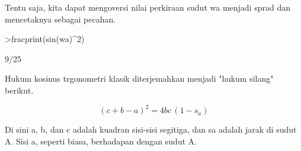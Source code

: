 \documentclass[12pt,arial,letterpaper]{book}
\begin{document}
\begin{eulercomment}
\begin{eulercomment}
\begin{eulercomment}
\begin{eulercomment}
\begin{eulercomment}
\begin{eulercomment}
\begin{eulercomment}
\begin{eulercomment}
\begin{eulercomment}
\begin{eulercomment}
\begin{eulercomment}
\begin{eulercomment}
\begin{eulercomment}
\begin{eulercomment}
\begin{eulercomment}
\begin{eulercomment}
\begin{eulercomment}
\begin{eulercomment}
\begin{eulercomment}
\begin{eulercomment}
\begin{eulercomment}
\begin{eulercomment}
\begin{eulercomment}
\begin{eulercomment}
\begin{eulercomment}
\begin{eulercomment}
\begin{eulercomment}
\begin{eulercomment}
\begin{eulercomment}
Tentu saja, kita dapat mengoversi nilai perkiraan sudut wa menjadi
sprad dan mencetaknya sebagai pecahan.
\end{eulercomment}
\begin{eulerprompt}
>fracprint(sin(wa)^2)
\end{eulerprompt}
\begin{euleroutput}
  9/25
\end{euleroutput}
\begin{eulercomment}
Hukum kosinus trgonometri klasik diterjemahkan menjadi "hukum silang"
berikut.

\end{eulercomment}
\begin{eulerformula}
\[
(c+b-a)^2 = 4 b c \, (1-s_a)
\]
\end{eulerformula}
\begin{eulercomment}
Di sini a, b, dan c adalah kuadran sisi-sisi segitiga, dan sa adalah
jarak di sudut A. Sisi a, seperti biasa, berhadapan dengan sudut A.


\end{eulercomment}
\end{eulercomment}
\end{eulercomment}
\end{eulercomment}
\end{eulercomment}
\end{eulercomment}
\end{eulercomment}
\end{eulercomment}
\end{eulercomment}
\end{eulercomment}
\end{eulercomment}
\end{eulercomment}
\end{eulercomment}
\end{eulercomment}
\end{eulercomment}
\end{eulercomment}
\end{eulercomment}
\end{eulercomment}
\end{eulercomment}
\end{eulercomment}
\end{eulercomment}
\end{eulercomment}
\end{eulercomment}
\end{eulercomment}
\end{eulercomment}
\end{eulercomment}
\end{eulercomment}
\end{eulercomment}
\end{eulercomment}
\end{document}
